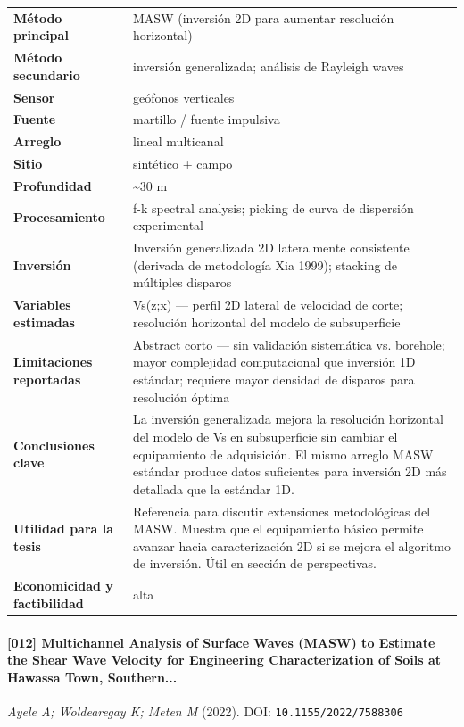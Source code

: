 \begin{center}\scriptsize
\begin{tabularx}{\textwidth}{@{}>{\bfseries}p{3.3cm} X@{}}
\toprule
M\'etodo principal & MASW (inversión 2D para aumentar resolución horizontal) \\
M\'etodo secundario & inversión generalizada; análisis de Rayleigh waves \\
Sensor & geófonos verticales \\
Fuente & martillo / fuente impulsiva \\
Arreglo & lineal multicanal \\
Sitio & sintético + campo \\
Profundidad & \textasciitilde{}30 m \\
Procesamiento & f-k spectral analysis; picking de curva de dispersión experimental \\
Inversi\'on & Inversión generalizada 2D lateralmente consistente (derivada de metodología Xia 1999); stacking de múltiples disparos \\
Variables estimadas & Vs(z;x) --- perfil 2D lateral de velocidad de corte; resolución horizontal del modelo de subsuperficie \\
Limitaciones reportadas & Abstract corto --- sin validación sistemática vs. borehole; mayor complejidad computacional que inversión 1D estándar; requiere mayor densidad de disparos para resolución óptima \\
Conclusiones clave & La inversión generalizada mejora la resolución horizontal del modelo de Vs en subsuperficie sin cambiar el equipamiento de adquisición. El mismo arreglo MASW estándar produce datos suficientes para inversión 2D más detallada que la estándar 1D. \\
Utilidad para la tesis & Referencia para discutir extensiones metodológicas del MASW. Muestra que el equipamiento básico permite avanzar hacia caracterización 2D si se mejora el algoritmo de inversión. Útil en sección de perspectivas. \\
Economicidad y factibilidad & alta \\
\bottomrule
\end{tabularx}
\end{center}

\paragraph{[012] Multichannel Analysis of Surface Waves (MASW) to Estimate the Shear Wave Velocity for Engineering Characterization of Soils at Hawassa Town, Southern...} \emph{Ayele A; Woldearegay K; Meten M} (2022).
{\scriptsize DOI: \texttt{10.1155/2022/7588306}}

